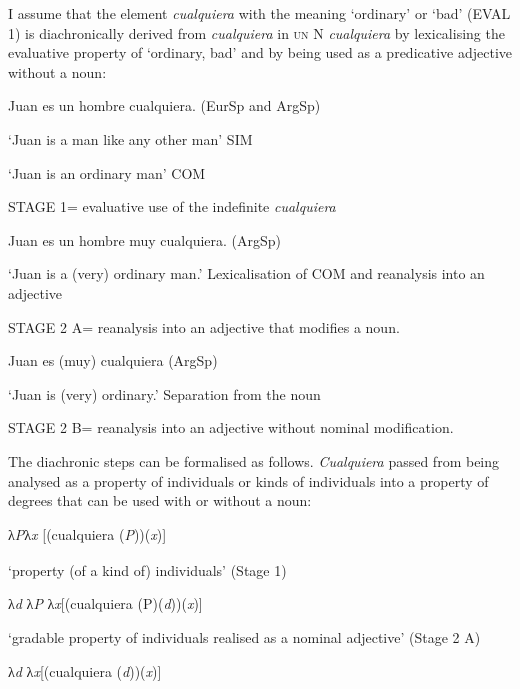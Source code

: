 \documentclass[output=paper]{langscibook}
\begin{document}
I assume that the element \textit{cualquiera} with the meaning ‘ordinary’ or ‘bad’ (EVAL 1) is diachronically derived from \textit{cualquiera} in \textsc{un} N \textit{cualquiera} by lexicalising the evaluative property of ‘ordinary, bad’ and by being used as a predicative adjective without a noun:

    Juan es un hombre cualquiera. (EurSp and ArgSp)

‘Juan is a man like any other man’ SIM

‘Juan is an ordinary man’ COM

STAGE 1= evaluative use of the indefinite \textit{cualquiera} 

    Juan es un hombre muy cualquiera. (ArgSp)

‘Juan is a (very) ordinary man.’ Lexicalisation of COM and reanalysis into an adjective

STAGE 2 A= reanalysis into an adjective that modifies a noun.

    Juan es (muy) cualquiera (ArgSp) 

‘Juan is (very) ordinary.’ Separation from the noun

STAGE 2 B= reanalysis into an adjective without nominal modification.

The diachronic steps can be formalised as follows. \textit{Cualquiera} passed from being analysed as a property of individuals or kinds of individuals into a property of degrees that can be used with or without a noun:

\begin{styleTabellenInhalt}
     λ\textit{P}λ\textit{x\textsubscript{} }[(cualquiera (\textit{P}))(\textit{x})]  
\end{styleTabellenInhalt}

\begin{styleTabellenInhalt}
‘property (of a kind of) individuals’    (Stage 1)
\end{styleTabellenInhalt}

\begin{styleTabellenInhalt}
    λ\textit{d} λ\textit{P} λ\textit{x}[(cualquiera (P)(\textit{d}))(\textit{x})]
\end{styleTabellenInhalt}

\begin{styleTabellenInhalt}
‘gradable property of individuals realised as a nominal adjective’  (Stage 2 A)
\end{styleTabellenInhalt}

\begin{styleTabellenInhalt}
    λ\textit{d} λ\textit{x}[(cualquiera (\textit{d}))(\textit{x})]
\end{styleTabellenInhalt}
\end{document}
